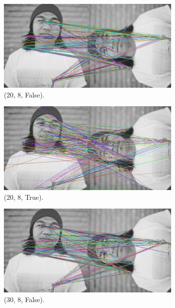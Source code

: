 \begin{figure}[h!]
\centering
\begin{subfigure}{0.5\textwidth}
  \centering
  \includegraphics[width=0.9\linewidth]{figs/match-20-8-false.jpg}
  \caption{(20, 8, False).}
\end{subfigure}%
\begin{subfigure}{0.5\textwidth}
  \centering
  \includegraphics[width=0.9\linewidth]{figs/match-20-8-true.jpg}
  \caption{(20, 8, True).}
\end{subfigure}
\begin{subfigure}{0.5\textwidth}
  \centering
  \includegraphics[width=0.9\linewidth]{figs/match-30-8-false.jpg}
  \caption{(30, 8, False).}
\end{subfigure}%
\begin{subfigure}{0.5\textwidth}

\end{subfigure}
\end{figure}
